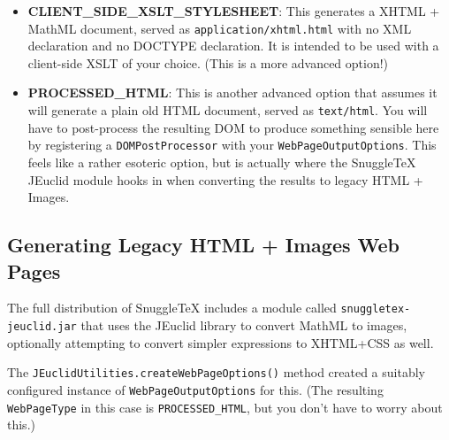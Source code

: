 \begin{itemize}
  \item {} \textbf{CLIENT\_SIDE\_XSLT\_STYLESHEET}:
    This generates a XHTML + MathML document,
    served as \verb|application/xhtml.html| with no XML declaration and no DOCTYPE declaration.
    It is intended to be used with a client-side XSLT of your choice.
    (This is a more advanced option!)

  \item \textbf{PROCESSED\_HTML}:
    This is another advanced option that assumes it will generate a plain old
    HTML document, served as \verb|text/html|.
    You will have to post-process the resulting DOM to produce something sensible here
    by registering a \verb|DOMPostProcessor| with your \verb|WebPageOutputOptions|.
    This feels like a rather esoteric option, but is actually where the SnuggleTeX JEuclid
    module hooks in when converting the results to legacy HTML + Images.

\end{itemize}

\subsection*{Generating Legacy HTML + Images Web Pages}

The full distribution of SnuggleTeX includes a module called \verb|snuggletex-jeuclid.jar|
that uses the JEuclid library to convert MathML to images, optionally attempting to
convert simpler expressions to XHTML+CSS as well.

The \verb|JEuclidUtilities.createWebPageOptions()| method created a suitably
configured instance of \verb|WebPageOutputOptions| for this. (The resulting
\verb|WebPageType| in this case is \verb|PROCESSED_HTML|, but you don't have to
worry about this.)
